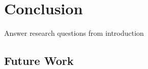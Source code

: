 %
\chapter{Conclusion}
\label{sec:conclusion}

Answer research questions from introduction

\section{Future Work}
\label{sec:conclusion:future}

\Blindtext[2][2]
